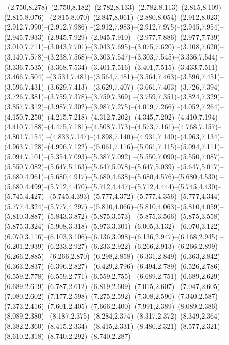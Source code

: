   --(2.750,8.278)--(2.750,8.182)--(2.782,8.133)--(2.782,8.113)--(2.815,8.109)--(2.815,8.076)%
  --(2.815,8.070)--(2.847,8.061)--(2.880,8.054)--(2.912,8.023)--(2.912,7.990)--(2.912,7.986)%
  --(2.912,7.983)--(2.912,7.975)--(2.945,7.954)--(2.945,7.933)--(2.945,7.929)--(2.945,7.910)%
  --(2.977,7.886)--(2.977,7.739)--(3.010,7.711)--(3.043,7.701)--(3.043,7.695)--(3.075,7.620)%
  --(3.108,7.620)--(3.140,7.578)--(3.238,7.568)--(3.303,7.547)--(3.303,7.545)--(3.336,7.544)%
  --(3.336,7.535)--(3.368,7.534)--(3.401,7.516)--(3.401,7.515)--(3.433,7.511)--(3.466,7.504)%
  --(3.531,7.481)--(3.564,7.481)--(3.564,7.463)--(3.596,7.451)--(3.596,7.431)--(3.629,7.413)%
  --(3.629,7.407)--(3.661,7.403)--(3.726,7.394)--(3.726,7.381)--(3.759,7.378)--(3.759,7.369)%
  --(3.759,7.351)--(3.824,7.329)--(3.857,7.312)--(3.987,7.302)--(3.987,7.275)--(4.019,7.266)%
  --(4.052,7.264)--(4.150,7.250)--(4.215,7.218)--(4.312,7.202)--(4.345,7.202)--(4.410,7.194)%
  --(4.410,7.188)--(4.475,7.181)--(4.508,7.173)--(4.573,7.161)--(4.768,7.157)--(4.801,7.154)%
  --(4.833,7.147)--(4.898,7.140)--(4.931,7.140)--(4.963,7.134)--(4.963,7.128)--(4.996,7.122)%
  --(5.061,7.116)--(5.061,7.115)--(5.094,7.111)--(5.094,7.101)--(5.354,7.093)--(5.387,7.092)%
  --(5.550,7.090)--(5.550,7.087)--(5.550,7.082)--(5.647,5.163)--(5.647,5.078)--(5.647,5.039)%
  --(5.647,5.017)--(5.680,4.961)--(5.680,4.917)--(5.680,4.638)--(5.680,4.576)--(5.680,4.530)%
  --(5.680,4.499)--(5.712,4.470)--(5.712,4.447)--(5.712,4.444)--(5.745,4.430)--(5.745,4.427)%
  --(5.745,4.393)--(5.777,4.372)--(5.777,4.356)--(5.777,4.344)--(5.777,4.324)--(5.777,4.297)%
  --(5.810,4.066)--(5.810,4.063)--(5.810,4.059)--(5.810,3.887)--(5.843,3.872)--(5.875,3.573)%
  --(5.875,3.566)--(5.875,3.558)--(5.875,3.324)--(5.908,3.318)--(5.973,3.301)--(6.005,3.132)%
  --(6.070,3.122)--(6.070,3.116)--(6.103,3.106)--(6.136,3.098)--(6.136,2.947)--(6.168,2.945)%
  --(6.201,2.939)--(6.233,2.927)--(6.233,2.922)--(6.266,2.913)--(6.266,2.899)--(6.266,2.885)%
  --(6.266,2.870)--(6.298,2.858)--(6.331,2.849)--(6.363,2.842)--(6.363,2.837)--(6.396,2.827)%
  --(6.429,2.796)--(6.494,2.789)--(6.526,2.786)--(6.559,2.778)--(6.559,2.771)--(6.559,2.755)%
  --(6.689,2.751)--(6.689,2.629)--(6.689,2.619)--(6.787,2.612)--(6.819,2.609)--(7.015,2.607)%
  --(7.047,2.605)--(7.080,2.602)--(7.177,2.598)--(7.275,2.592)--(7.308,2.590)--(7.340,2.587)%
  --(7.373,2.416)--(7.601,2.405)--(7.666,2.400)--(7.991,2.389)--(8.089,2.386)--(8.089,2.380)%
  --(8.187,2.375)--(8.284,2.374)--(8.317,2.372)--(8.349,2.364)--(8.382,2.360)--(8.415,2.334)%
  --(8.415,2.331)--(8.480,2.321)--(8.577,2.321)--(8.610,2.318)--(8.740,2.292)--(8.740,2.287)%
